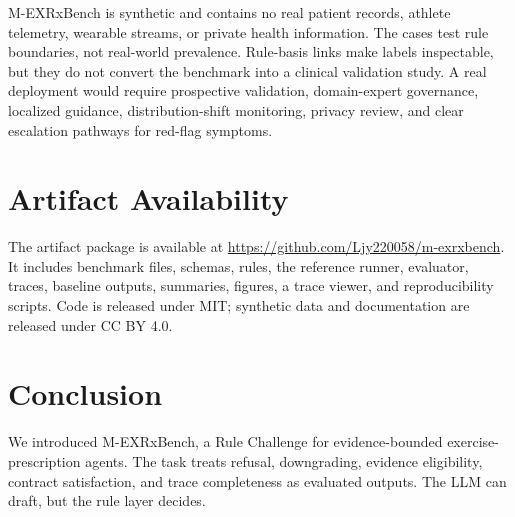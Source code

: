\documentclass{ceurart}
\begin{document}
M-EXRxBench is synthetic and contains no real patient records, athlete telemetry, wearable streams, or private health information. The cases test rule boundaries, not real-world prevalence. Rule-basis links make labels inspectable, but they do not convert the benchmark into a clinical validation study. A real deployment would require prospective validation, domain-expert governance, localized guidance, distribution-shift monitoring, privacy review, and clear escalation pathways for red-flag symptoms.

\section{Artifact Availability}

The artifact package is available at
\url{https://github.com/Ljy220058/m-exrxbench}.
It includes benchmark files, schemas, rules, the reference runner, evaluator,
traces, baseline outputs, summaries, figures, a trace viewer, and reproducibility
scripts. Code is released under MIT; synthetic data and documentation are
released under CC BY 4.0.

\section{Conclusion}

We introduced M-EXRxBench, a Rule Challenge for evidence-bounded exercise-prescription agents. The task treats refusal, downgrading, evidence eligibility, contract satisfaction, and trace completeness as evaluated outputs. The LLM can draft, but the rule layer decides.


\end{document}
